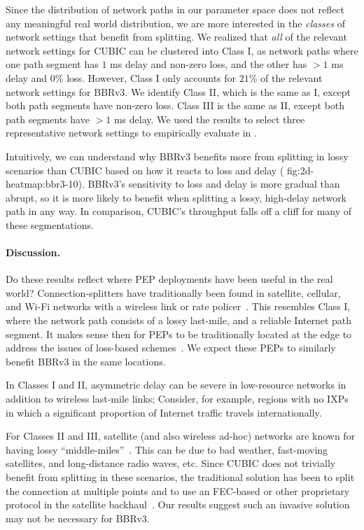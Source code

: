 

Since the distribution of network paths in our parameter space does not reflect
any meaningful real world distribution, we are more interested in the \textit
{classes} of network settings that benefit from splitting. We realized
that \textit{all} of the relevant network settings for CUBIC can be clustered
into Class I, as network paths where one path segment has $1$ ms delay and
non-zero loss, and the other has $>1$ ms delay and $0\%$ loss. However, Class
I only accounts for $21\%$ of the relevant network settings for BBRv3. We
identify Class II, which is the same as I, except both path segments have
non-zero loss. Class III is the same as II, except both path segments have
$>1$ ms delay. We used the results to select three representative network
settings to empirically evaluate in .

Intuitively, we can understand why BBRv3 benefits more from splitting in lossy
scenarios than CUBIC based on how it reacts to loss and delay (\Cref
{fig:2d-heatmap:bbr3-10}). BBRv3's sensitivity to loss
and delay is more gradual than abrupt, so it is more likely to benefit when
splitting a lossy, high-delay network path in any way. In comparison, CUBIC's
throughput falls off a cliff for many of these segmentations.

\paragraph{Discussion.}
Do these results reflect where PEP deployments have been useful in the real
world? Connection-splitters have traditionally been found in satellite,
cellular, and Wi-Fi networks with a wireless link or rate policer~\cite
{edeline2019bottomup,honda2011still}. This resembles Class I, where the
network path consists of a lossy last-mile, and a reliable Internet path
segment. It makes sense then for PEPs to be traditionally located at the edge
to address the issues of loss-based schemes~\cite
{cloudsplitting2010,rfc3135,farkas2012splittcp}. We expect these PEPs to
similarly benefit BBRv3 in the same locations.

In Classes I and II, asymmetric delay can be severe in low-resource networks
in addition to wireless last-mile links;
Consider, for example, regions with no IXPs in which a significant proportion
of Internet traffic travels internationally.

For Classes II and III, satellite (and also wireless ad-hoc)
networks are known for
having lossy ``middle-miles''~\cite{kuhn2021quic-over-sat,border2020evaluating,pirovano2013new,cloudsplitting2010}.
This can be due to bad weather, fast-moving satellites, and
long-distance radio waves, etc.
Since CUBIC does not trivially benefit from splitting in these scenarios, the
traditional solution has been to split the connection at multiple points and to
use an FEC-based or other proprietary protocol in the satellite backhaul~\cite
{cloudsplitting2010,border2020evaluating,rfc3135}.
Our results suggest such an invasive solution may not be necessary for BBRv3.

